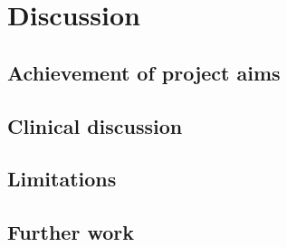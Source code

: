 \section{Discussion}

\subsection{Achievement of project aims}

\subsection{Clinical discussion}

\subsection{Limitations}

\subsection{Further work}